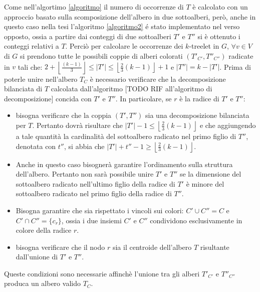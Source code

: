 Come nell'algortimo \ref{algoritmo} il numero di occorrenze di $ T $ è calcolato con un approccio basato sulla scomposizione dell'albero in due sottoalberi,  per\`o, anche in questo caso nella tesi l'algoritmo \ref{algoritmo2} \'e stato implementato nel verso opposto, ossia a partire dai conteggi di due sottoalberi $ T' $ e $ T'' $ si \`e ottenuto i conteggi relativi a $ T $. %
Perci\`o per calcolare le occorrenze dei $ k $-treelet in $ G $, $ \forall v \in V $ di $ G $ si prendono tutte le possibili coppie di alberi colorati $ (T'_{C'}, T''_{C''} )$ radicate in $ v $ tali che: $ 2+ \left\lfloor \frac{(k-1)}{3}  \right\rfloor \le |T'| \le \left\lfloor \frac{2}{3}(k-1) \right\rfloor  +1 $ e $ |T''| = k-|T'| $.
Prima di poterle unire nell'albero $ T_C $ è necessario 
verificare che la decomposizione bilanciata di $T$ calcolata dall'algoritmo [TODO RIF all'algoritmo di decomposizione] concida con $T'$ e $T''$. In particolare, se $r$ è la radice di $T'$ e $T''$:
\begin{itemize}
	\label{prova}
	\item bisogna verificare che la coppia $ (T',T'') $ sia una decomposizione bilanciata per $ T $.
	Pertanto dovr\`a risultare che $ |T'| - 1 \le \left\lfloor\frac{2}{3}(k-1)\right\rfloor $ e che aggiungendo a tale quantit\`a la cardinalit\`a del sottoalbero radicato nel primo figlio di $ T'' $, denotata con $ t'' $, si abbia che $ |T'| + t'' - 1 \ge \left\lfloor\frac{2}{3}(k-1)\right\rfloor $.
	\item Anche in questo caso bisogner\`a garantire l'ordinamento sulla struttura dell'albero. %
	Pertanto non sar\`a possibile unire $ T' $ e $ T'' $ se la dimensione del sottoalbero radicato nell'ultimo figlio della radice di $ T' $ \`e minore del sottoalbero radicato nel primo figlio della radice di $ T'' $.
	\item Bisogna garantire che sia rispettato i vincoli sui colori: $C' \cup C'' = C$ e $ C' \cap C'' = \{c_r\}$, ossia i due insiemi $C'$ e $C''$ condividono esclusivamente in colore della radice $ r $.
	\item bisogna verificare che il nodo $ r $ sia il centroide dell'albero $ T $ risultante dall'unione di $ T' $ e $ T'' $. 
\end{itemize}
Queste condizioni sono necessarie affinch\`e l'unione %
tra gli alberi $ T'_{C'} $ e $ T''_{C''} $ produca un albero valido $ T_C $.

